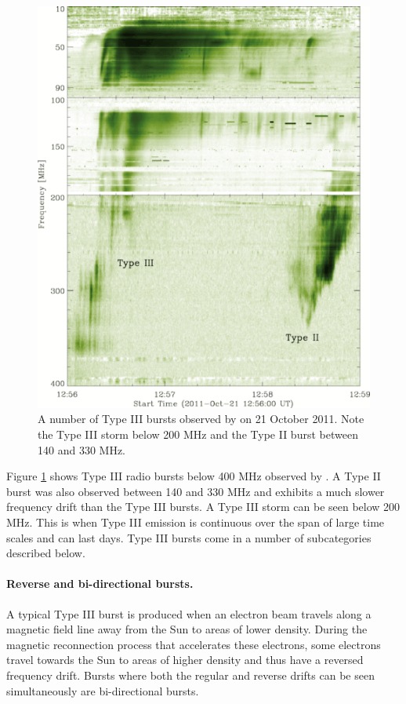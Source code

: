 \begin{figure}[ht]
    \centering
    \includegraphics[width=0.75\columnwidth]{Images/Pietro_typeIII.png}
    \caption[A number of Type III bursts observed by \cite{Zucca2012} on 21 October 2011.]{A number of Type III bursts observed by \cite{Zucca2012} on 21 October 2011. Note the Type III storm below 200 MHz and the Type II burst between 140 and 330 MHz.}
    \label{fig:bursts}
\end{figure}

Figure \ref{fig:bursts} shows Type III radio bursts below 400 MHz observed by \cite{Zucca2012}. A Type II burst was also observed between 140 and 330 MHz and exhibits a much slower frequency drift than the Type III bursts. A Type III storm can be seen below 200 MHz. This is when Type III emission is continuous over the span of large time scales and can last days. Type III bursts come in a number of subcategories described below.

\paragraph{Reverse and bi-directional bursts.}

A typical Type III burst is produced when an electron beam travels along a magnetic field line away from the Sun to areas of lower density. During the magnetic reconnection process that accelerates these electrons, some electrons travel towards the Sun to areas of higher density and thus have a reversed frequency drift. Bursts where both the regular and reverse drifts can be seen simultaneously are bi-directional bursts.

